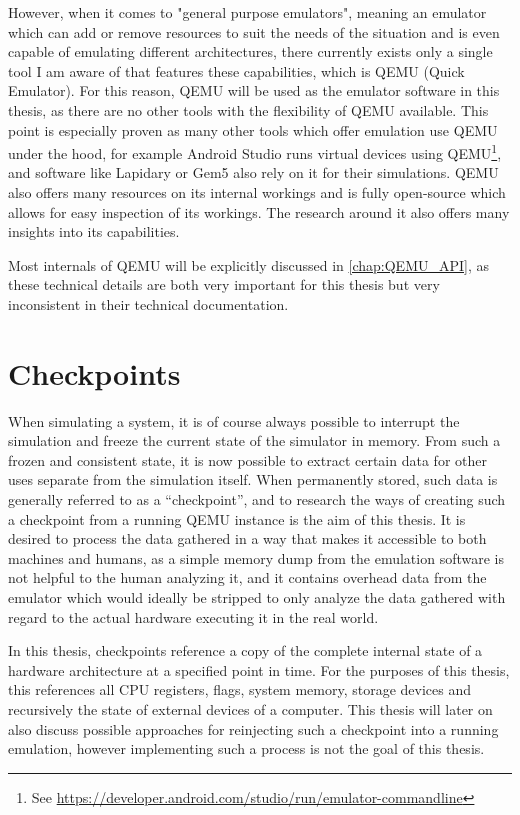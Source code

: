 However, when it comes to "general purpose emulators",
meaning an emulator which can add or remove resources to suit the needs of the situation
and is even capable of emulating different architectures,
there currently exists only a single tool I am aware of that features these capabilities,
which is QEMU (Quick Emulator).
For this reason, QEMU will be used as the emulator software in this thesis,
as there are no other tools with the flexibility of QEMU available.
This point is especially proven as many other tools which offer emulation
use QEMU under the hood, for example Android Studio runs virtual devices using QEMU\footnote{See \href{https://developer.android.com/studio/run/emulator-commandline?hl=de}{https://developer.android.com/studio/run/emulator-commandline}},
and software like Lapidary\cite{lapidary} or Gem5\cite{gem5} also rely on it for their simulations.
QEMU also offers many resources on its internal workings and is fully open-source
which allows for easy inspection of its workings.
The research around it also offers many insights into its capabilities.

Most internals of QEMU will be explicitly discussed in \autoref{chap:QEMU_API},
as these technical details are both very important for this thesis
but very inconsistent in their technical documentation.

\section{Checkpoints}
When simulating a system, it is of course always possible to interrupt the simulation and freeze the current state of the simulator in memory.
From such a frozen and consistent state, it is now possible to extract certain data
for other uses separate from the simulation itself.
When permanently stored, such data is generally referred to as a \enquote{checkpoint},
and to research the ways of creating such a checkpoint from a running QEMU instance is the aim of this thesis.
It is desired to process the data gathered in a way that makes it accessible to both machines and humans,
as a simple memory dump from the emulation software is not helpful to the human analyzing it,
and it contains overhead data from the emulator which would ideally be stripped
to only analyze the data gathered with regard to the actual hardware executing it in the real world.

In this thesis, checkpoints reference a copy of the complete internal state of a hardware architecture at a specified point in time.
For the purposes of this thesis, this references all CPU registers, flags, system memory,
storage devices and recursively the state of external devices of a computer.
This thesis will later on also discuss possible approaches for reinjecting such a checkpoint
into a running emulation, however implementing such a process is not the goal of this thesis.

